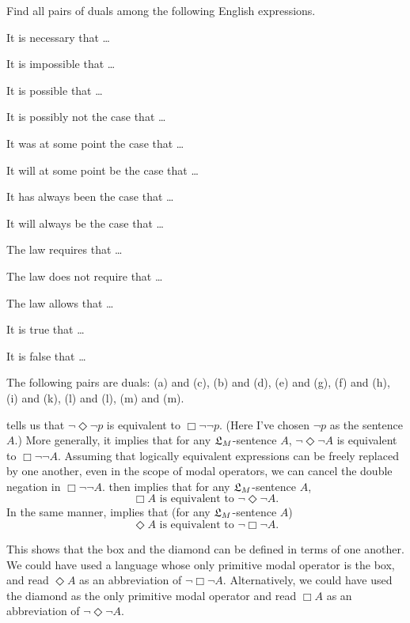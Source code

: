 \begin{exercise}
  Find all pairs of duals among the following English expressions.
  \begin{exlist}
  \item It is necessary that \ldots
  \item It is impossible that \ldots
  \item It is possible that \ldots
  \item It is possibly not the case that \ldots
  \item It was at some point the case that \ldots
  \item It will at some point be the case that \ldots
  \item It has always been the case that \ldots
  \item It will always be the case that \ldots
  \item The law requires that \ldots
  \item The law does not require that \ldots
  \item The law allows that \ldots
  \item It is true that \ldots
  \item It is false that \ldots
  \end{exlist}
\end{exercise}
\begin{solution}
  The following pairs are duals: (a) and (c), (b) and (d), (e) and
  (g), (f) and (h), (i) and (k), (l) and (l), (m) and (m).
\end{solution}

 tells us that $\neg\Diamond\neg p$ is equivalent to $\Box\neg\neg p$.
(Here I've chosen $\neg p$ as the sentence $A$.) More generally, it implies that
for any $\mathfrak{L}_{M}$-sentence $A$, $\neg\Diamond\neg A$ is equivalent to
$\Box \neg\neg A$. Assuming that logically equivalent expressions can be freely
replaced by one another, even in the scope of modal
operators,\label{claim:replacement} we can cancel the double negation in
$\Box \neg\neg A$.  then implies that for any $\mathfrak{L}_{M}$-sentence $A$,
\[
   \Box A\text{ is equivalent to }\neg\Diamond\neg A.
\]
In the same manner,  implies that (for any $\mathfrak{L}_{M}$-sentence $A$)
\[
   \Diamond A\text{ is equivalent to }\neg\Box\neg A.
\]

This shows that the box and the diamond can be defined in terms of one another.
We could have used a language whose only primitive modal operator is the box,
and read $\Diamond A$ as an abbreviation of $\neg\Box\neg A$. Alternatively, we
could have used the diamond as the only primitive modal operator and read
$\Box A$ as an abbreviation of $\neg\Diamond\neg A$.

